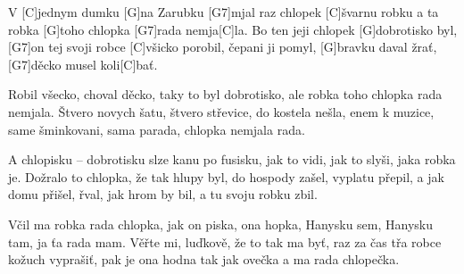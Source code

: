 
\sloka
V [C]jednym dumku [G]na Zarubku [G7]mjal raz chlopek [C]švarnu robku
a ta robka [G]toho chlopka [G7]rada nemja[C]la.
Bo ten jeji chlopek [G]dobrotisko byl,
[G7]on tej svoji robce [C]všicko porobil,
čepani ji pomyl, [G]bravku daval žrať,
[G7]děcko musel koli[C]bať.

\sloka
Robil všecko, choval děcko, taky to byl dobrotisko,
ale robka toho chlopka rada nemjala.
Štvero novych šatu, štvero střevice,
do kostela nešla, enem k muzice,
same šminkovani, sama parada,
chlopka nemjala rada.

\sloka
A chlopisku – dobrotisku slze kanu po fusisku,
jak to vidi, jak to slyši, jaka robka je.
Dožralo to chlopka, že tak hlupy byl,
do hospody zašel, vyplatu přepil,
a jak domu přišel, řval, jak hrom by bil,
a tu svoju robku zbil.

\sloka
Včil ma robka rada chlopka, jak on piska, ona hopka,
Hanysku sem, Hanysku tam, ja ťa rada mam.
Věřte mi, luďkově, že to tak ma byť,
raz za čas třa robce kožuch vyprašiť,
pak je ona hodna tak jak ovečka
a ma rada chlopečka.
